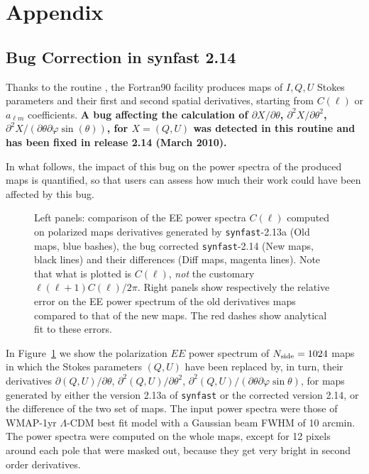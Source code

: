 \section[Appendix]{Appendix}
\label{fac:appendix}
\subsection{Bug Correction in synfast 2.14}
\label{fac:sec:bug_synder}
Thanks to the routine , the Fortran90 
facility  produces
maps of $I,Q,U$ Stokes parameters and their first and second spatial derivatives,
starting from $C(\ell)$ or $a_{\ell m}$ coefficients.
{\bf A bug affecting the calculation of $\partial X/\partial\theta$, 
$\partial^2 X/\partial \theta^2$, 
$\partial^2 X/(\partial\theta\partial\varphi\sin(\theta))$, for $X=(Q,U)$
was detected in this routine and has been fixed in release 2.14 (March 2010).}

In what follows, the impact of this bug on the power spectra of
the produced maps is quantified, so that users can
assess how much their work could have been affected by this bug.

\begin{figure}[hb]
\caption[Derivatives power spectra]{%
\label{fig:bug_derQU}\latexhtml{\footnotesize}{}%
Left panels: comparison of the EE power spectra $C(\ell)$ computed on polarized maps
derivatives generated by
{\tt synfast}-2.13a (Old maps, blue bashes), the bug corrected {\tt synfast}-2.14 (New maps, black lines)
and their differences (Diff maps, magenta lines). Note that what is plotted is
$C(\ell)$, {\em not} the customary $\ell(\ell+1)C(\ell)/2\pi$. Right panels show respectively
the relative error on the EE power spectrum of the old derivatives maps compared
to that of the new maps.
The red dashes show analytical fit to these errors.
}
\end{figure}
In Figure~\ref{fig:bug_derQU} we show the polarization $EE$ power spectrum of
${N_{\textrm{side}}} = 1024$ maps
in which the Stokes parameters $(Q,U)$ have been replaced by, in turn, their derivatives
$\partial (Q,U)/\partial\theta$, 
$\partial^2 (Q,U)/\partial \theta^2$, 
$\partial^2 (Q,U)/(\partial\theta\partial\varphi\sin\theta)$, 
for maps generated
by either the version 2.13a of {\tt synfast} or the corrected version 2.14, or
the difference of the two set of maps.
The input power spectra were those of WMAP-1yr $\Lambda$-CDM best fit model with a Gaussian
beam FWHM of 10 arcmin. The power spectra were computed on the whole maps, except
for 12 pixels around each pole that were masked out, because they get very
bright in second order derivatives.

